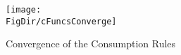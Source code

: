 \hypertarget{cFuncsConverge}{}
\begin{figure}[tbp]
\centerline{\texttt{[image: \\FigDir/cFuncsConverge]}}
\caption{Convergence of the Consumption Rules}
\label{fig:cFuncsConverge}
\end{figure}
